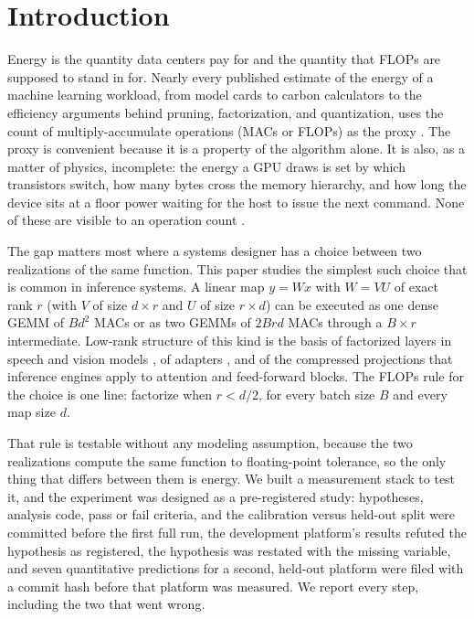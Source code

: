 \documentclass{article}
\begin{document}
\printAffiliationsAndNotice{}

\section{Introduction}
\label{sec:intro}

Energy is the quantity data centers pay for and the quantity that FLOPs are supposed to stand in for. Nearly every published estimate of the energy of a machine learning workload, from model cards to carbon calculators to the efficiency arguments behind pruning, factorization, and quantization, uses the count of multiply-accumulate operations (MACs or FLOPs) as the proxy \cite{henderson2020systematic,schwartz2020green,patterson2021carbon,lacoste2019quantifying}. The proxy is convenient because it is a property of the algorithm alone. It is also, as a matter of physics, incomplete: the energy a GPU draws is set by which transistors switch, how many bytes cross the memory hierarchy, and how long the device sits at a floor power waiting for the host to issue the next command. None of these are visible to an operation count \cite{horowitz2014}.

The gap matters most where a systems designer has a choice between two realizations of the same function. This paper studies the simplest such choice that is common in inference systems. A linear map $y = Wx$ with $W = VU$ of exact rank $r$ (with $V$ of size $d \times r$ and $U$ of size $r \times d$) can be executed as one dense GEMM of $B d^2$ MACs or as two GEMMs of $2 B r d$ MACs through a $B \times r$ intermediate. Low-rank structure of this kind is the basis of factorized layers in speech and vision models \cite{sainath2013lowrank,denton2014exploiting,jaderberg2014speeding}, of adapters \cite{hu2022lora}, and of the compressed projections that inference engines apply to attention and feed-forward blocks. The FLOPs rule for the choice is one line: factorize when $r < d/2$, for every batch size $B$ and every map size $d$.

That rule is testable without any modeling assumption, because the two realizations compute the same function to floating-point tolerance, so the only thing that differs between them is energy. We built a measurement stack to test it, and the experiment was designed as a pre-registered study: hypotheses, analysis code, pass or fail criteria, and the calibration versus held-out split were committed before the first full run, the development platform's results refuted the hypothesis as registered, the hypothesis was restated with the missing variable, and seven quantitative predictions for a second, held-out platform were filed with a commit hash before that platform was measured. We report every step, including the two that went wrong.
\end{document}
